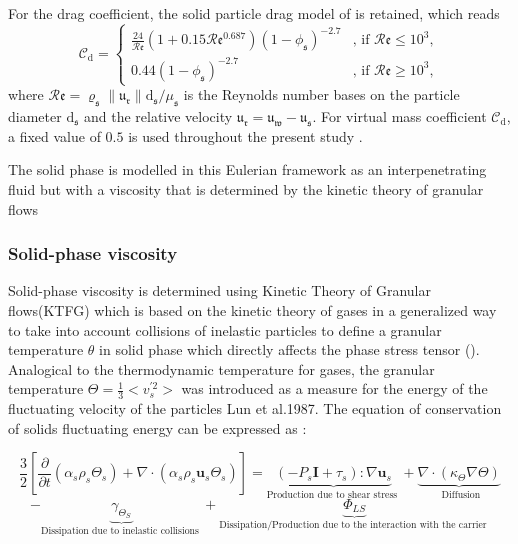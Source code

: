 \documentclass[review,3p,times,12pt]{elsarticle}
\begin{document}
%
For the drag coefficient, the solid particle drag model of \citet{wen1966generalized} is retained, which reads
\begin{equation}
\mathcal{C}_{\mathrm{d}}=
\begin{cases}
\frac{24}{\mathcal{R}\mathfrak{e}}\left(1+0.15\mathcal{R}\mathfrak{e}^{0.687}\right)\left(1-\phi_{\mathfrak{s}}\right)^{-2.7}&\text{, if } \mathcal{R}\mathfrak{e}\le 10^3,\\
0.44\left(1-\phi_{\mathfrak{s}}\right)^{-2.7} &\text{, if } \mathcal{R}\mathfrak{e}\ge 10^3,
\end{cases}
\end{equation}
where $\mathcal{R}\mathfrak{e}=\varrho_{\mathfrak{s}}\|\mathfrak{u}_{\mathfrak{r}}\|\mathrm{d}_{\mathfrak{s}}/\mu_{\mathfrak{s}}$ is the Reynolds number bases on the particle diameter $\mathrm{d}_{\mathfrak{s}}$ and the relative velocity $\boldsymbol{\mathfrak{u}}_{\mathfrak{r}}=\boldsymbol{\mathfrak{u}}_{\mathfrak{w}}-\boldsymbol{\mathfrak{u}}_{\mathfrak{s}}$. For virtual mass coefficient 
$\mathcal{C}_{\mathrm{d}}$, a fixed value of $0.5$ is used throughout the present study \cite{auton1988force}.
  
  
The solid phase is modelled in this Eulerian framework as an interpenetrating fluid but with a viscosity that is determined by the kinetic theory of granular flows 
\subsubsection{Solid-phase viscosity}
Solid-phase viscosity is determined using Kinetic Theory of Granular flows(KTFG) which is based on the kinetic theory of gases in a generalized way to take into account collisions of inelastic particles to define a granular temperature $\theta$ in solid phase which directly affects the phase stress tensor (\cite{Gonzalez-2017}). Analogical to the thermodynamic temperature for gases, the granular temperature $\Theta=\frac{1}{3}<v_{s}^{\prime 2}>$ was introduced as a measure for the energy of the fluctuating velocity of the particles {\color{red} Lun et al.1987.}
The equation of conservation of solids fluctuating energy can be expressed as \cite{Wang-2013}: 

\begin{equation}
\frac{3}{2}\left[\frac{\partial}{\partial t}\left(\alpha_{s} \rho_{s} \Theta_{s}\right)+\nabla \cdot\left(\alpha_{s} \rho_{s} \mathbf{u}_{s} \Theta_{s}\right)\right]= 
\underbrace{\left(-P_{s} \mathbf{I}+\tau_{s}\right): \nabla \mathbf{u}_{s}}_{\text {Production due to shear stress }}+\underbrace{\nabla \cdot\left(\kappa_{\Theta} \nabla \Theta\right)}_{\text { Diffusion}}
\end{equation}
$$
-\underbrace{\gamma_{\Theta_S}}_{\text {Dissipation due  to  inelastic collisions }}+\underbrace{\Phi_{LS}}_{\text {Dissipation/Production  due to the interaction with the carrier }}
$$
\end{document}
